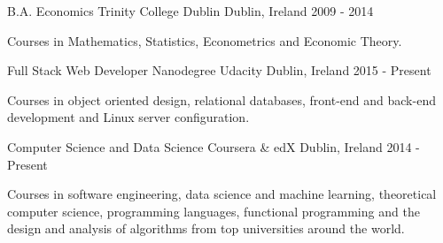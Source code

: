 

\begin{cventries}
  \cventry
    {B.A. Economics}
    {Trinity College Dublin}
    {Dublin, Ireland}
    {2009 - 2014}
    {
      \begin{cvitems}
      \item {Courses in Mathematics, Statistics, Econometrics and Economic Theory.}
      \end{cvitems}
    }
    
  \cventry
    {Full Stack Web Developer Nanodegree}
    {Udacity}
    {Dublin, Ireland}
    {2015 - Present}
    {
      \begin{cvitems}
      \item {Courses in object oriented design, relational databases, front-end and back-end development and Linux server configuration.}
      \end{cvitems}
    }
    
  \cventry
    {Computer Science and Data Science}
    {Coursera \& edX}
    {Dublin, Ireland}
    {2014 - Present}
    {
      \begin{cvitems}
      \item {Courses in software engineering, data science and machine learning, theoretical computer science, programming languages, functional programming and the design and analysis of algorithms from top universities around the world.}
      \end{cvitems}
    }
\end{cventries}



